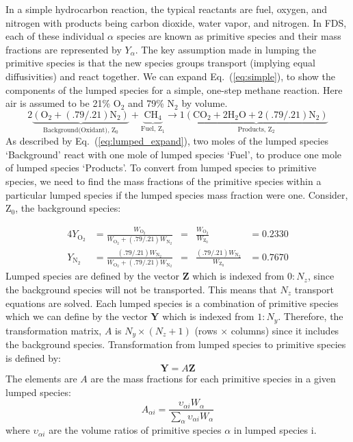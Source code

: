 In a simple hydrocarbon reaction, the typical reactants are fuel, oxygen, and nitrogen with products being carbon dioxide, water vapor, and nitrogen. In FDS, each of these individual $\alpha$ species are known as primitive species and their mass fractions are represented by $Y_{\alpha}$.
The key assumption made in lumping the primitive species is that the new species groups transport (implying equal diffusivities) and react together. We can expand Eq.~(\ref{eq:simple}), to show the components of the lumped species for a simple, one-step methane reaction. Here air is assumed to be 21\% O$_2$ and 79\% N$_2$ by volume.
\begin{equation}\label{eq:lumped_expand}
\mathrm{2\underbrace{(\mbox{O}_2+(.79/.21)\mbox{N}_2)}_\text{Background(Oxidant),~Z$_0$}+\underbrace{\mbox{CH}_4}_\text{Fuel,~Z$_1$} \rightarrow 1\underbrace{(\mbox{CO}_2+2\mbox{H}_2\mbox{O}+2(.79/.21)\mbox{N}_2)}_\text{Products,~Z$_2$}}
\end{equation}
As described by Eq.~(\ref{eq:lumped_expand}), two moles of the lumped species `Background' react with one mole of lumped species `Fuel', to produce one mole of lumped species `Products'. To convert from lumped species to primitive species, we need to find the mass fractions of the primitive species within a particular lumped species if the lumped species mass fraction were one. Consider, Z$_0$, the background species:

\begin{alignat}{4}\label{eq:backgroud}
Y_\mathrm{O_{2}} &= \frac{W_\mathrm{O_{2}}}{W_\mathrm{O_{2}}+(.79/.21)W_\mathrm{N_{2}}} &=& \frac{W_\mathrm{O_{2}}}{W_{\mathrm{Z_0}}} &= 0.2330 \\
\nonumber Y_\mathrm{N_{2}} &= \frac{(.79/.21)W_\mathrm{N_{2}}}{W_\mathrm{O_{2}}+(.79/.21)W_\mathrm{N_{2}}} &=& \frac{(.79/.21)W_\mathrm{N_{2}}}{W_{\mathrm{Z_0}}} &= 0.7670
\end{alignat}
Lumped species are defined by the vector $\textbf{Z}$ which is indexed from $0:N_{z}$, since the background species will not be transported. This means that $N_{z}$ transport equations are solved. Each lumped species is a combination of primitive species which we can define by the vector $\textbf{Y}$ which is indexed from $1:N_{y}$. Therefore, the transformation matrix, $A$ is $N_{y} \times (N_{z}+1)$ (rows $\times$ columns) since it includes the background species. Transformation from lumped species to primitive species is defined by: 
\begin{equation}\label{eq:transform}
\textbf{Y}=A\textbf{Z} 
\end{equation}
The elements are $A$ are the mass fractions for each primitive species in a given lumped species:
\begin{equation}\label{eq:A_def}
A_{\alpha i} = \frac{\upsilon_{\alpha i}W_{\alpha}}{\displaystyle \sum_{\alpha}\upsilon_{\alpha i}W_{\alpha}}
\end{equation}
where $\upsilon_{\alpha i}$ are the volume ratios of primitive species $\alpha$ in lumped species {i}.

